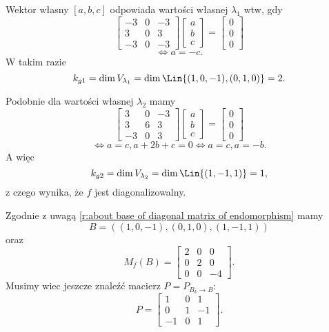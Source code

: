 \begin{solution}
    Wektor własny $[a, b, c]$ odpowiada wartości własnej $\lambda_1$ wtw, gdy
    \[ \begin{bmatrix}
        -3 & 0 & -3 \\
        3 & 0 & 3 \\
        -3 & 0 & -3
    \end{bmatrix}\begin{bmatrix}
        a \\ b \\ c
    \end{bmatrix} = \begin{bmatrix}
        0 \\ 0 \\ 0
    \end{bmatrix} \]
    \[ \iff a = -c. \]
    W takim razie
    \[ k_{g1} = \dim V_{\lambda_1} = \dim\Lin\{(1, 0, -1), (0, 1, 0)\} = 2. \]

    Podobnie dla wartości własnej $\lambda_2$ mamy
    \[ \begin{bmatrix}
        3 & 0 & -3 \\
        3 & 6 & 3 \\
        -3 & 0 & 3
    \end{bmatrix}\begin{bmatrix}
        a \\ b \\ c
    \end{bmatrix} = \begin{bmatrix}
        0 \\ 0 \\ 0
    \end{bmatrix} \]
    \[ \iff a = c, a + 2b + c = 0 \iff a = c, a = -b. \]
    A więc
    \[ k_{g2} = \dim V_{\lambda_2} = \dim\Lin\{(1, -1, 1)\} = 1, \]
    z czego wynika, że $f$ jest diagonalizowalny.

    Zgodnie z uwagą \ref{r:about base of diagonal matrix of endomorphism} mamy
    \[ B = ((1, 0, -1), (0, 1, 0), (1, -1, 1)) \]
    oraz
    \[ M_f(B) = \begin{bmatrix}
        2 & 0 & 0 \\
        0 & 2 & 0 \\
        0 & 0 & -4
    \end{bmatrix}. \]
    Musimy wiec jeszcze znaleźć macierz $P = P_{B_k\to B}$:
    \[ P = \begin{bmatrix}
        1 & 0 & 1 \\
        0 & 1 & -1 \\
        -1 & 0 & 1
    \end{bmatrix}. \]
\end{solution}

